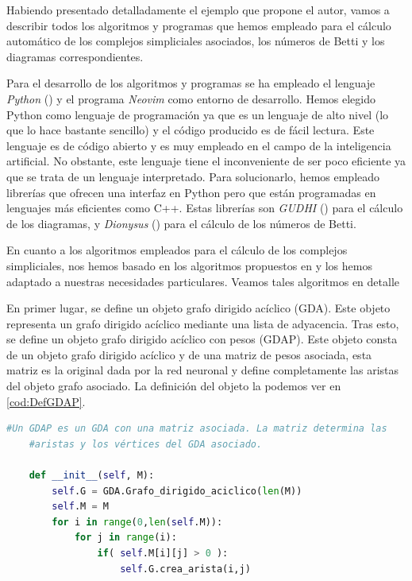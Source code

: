 \documentclass[12pt, a4paper, twoside]{book}
\numberwithin{equation}{section}
\theoremstyle{definition}
\theoremstyle{remark}
\theoremstyle{plain}
\begin{document}
	Habiendo presentado detalladamente el ejemplo que propone el autor, 
	vamos a describir todos los algoritmos y programas que hemos empleado
	para el cálculo automático de los complejos simpliciales asociados, 
	los números de Betti y los diagramas correspondientes.

	Para el desarrollo de los algoritmos y programas se ha empleado el 
	lenguaje \emph{Python} (\cite{10.5555/1593511}) y el programa 
	\emph{Neovim} como entorno de desarrollo. Hemos elegido Python como 
	lenguaje de programación ya que es un lenguaje de alto nivel (lo que 
	lo hace bastante sencillo) y el código producido es de fácil lectura. 
	Este lenguaje es de código abierto y es muy empleado en el campo de la 
	inteligencia artificial. No obstante, este lenguaje tiene el 
	inconveniente de ser poco eficiente ya que se trata de un lenguaje 
	interpretado. Para solucionarlo, hemos empleado librerías que ofrecen 
	una interfaz en Python pero que están programadas en lenguajes más 
	eficientes como C++. Estas librerías son \emph{GUDHI} 
	(\cite{gudhi:urm}) para el cálculo de los diagramas, y \emph{Dionysus} 
	(\cite{morozov_2021}) para el cálculo de los números de Betti.

	En cuanto a los algoritmos empleados para el cálculo de los complejos
	simpliciales, nos hemos basado en los algoritmos propuestos en 
	\cite{Algoritmos-Sedgewick} y los hemos adaptado a nuestras 
	necesidades particulares. Veamos tales algoritmos en detalle

	En primer lugar, se define un objeto grafo dirigido acíclico (GDA). 
	Este objeto representa un grafo dirigido acíclico mediante una lista 
	de adyacencia. Tras esto, se define un objeto grafo dirigido acíclico 
	con pesos (GDAP). Este objeto consta de un objeto grafo dirigido 
	acíclico y de una matriz de pesos asociada, esta matriz es la original 
	dada por la red neuronal y define completamente las aristas del objeto 
	grafo asociado. La definición del objeto la podemos ver en 
	\autoref{cod:DefGDAP}.

	\begin{lstlisting}[language=Python, float=htbp, label=cod:DefGDAP, caption= 
	Definición del objeto GDAP.]
	#Un GDAP es un GDA con una matriz asociada. La matriz determina las 
	#aristas y los vértices del GDA asociado.
    	
	def __init__(self, M):
        self.G = GDA.Grafo_dirigido_aciclico(len(M))
        self.M = M
        for i in range(0,len(self.M)):
            for j in range(i):
                if( self.M[i][j] > 0 ):
                    self.G.crea_arista(i,j)
		    
	\end{lstlisting}
\end{document}
